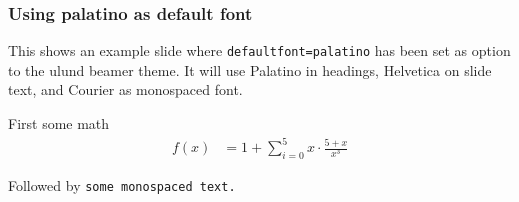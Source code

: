 \documentclass[aspectratio=1610]{beamer}
\begin{document}
\begin{frame}
  \frametitle{Using palatino as default font}
  This shows an example slide where \texttt{defaultfont=palatino} has been set as option to the ulund beamer theme. It will use Palatino in headings, Helvetica on slide text, and Courier as monospaced font.

  \medskip
  First some math
  \begin{align}
    f(x) &= 1 + \sum_{i=0}^{5} x \cdot \frac{5+x}{x^3}
  \end{align}

  \medskip
  Followed by \texttt{some monospaced text.}
\end{frame}

\end{document}
